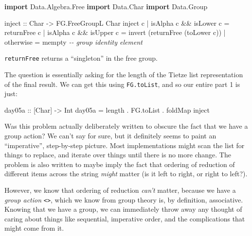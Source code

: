 \documentclass[]{article}
\newenvironment{Shaded}{}{}
\newcommand{\CommentTok}[1]{\textcolor[rgb]{0.38,0.63,0.69}{\textit{#1}}}
\newcommand{\DataTypeTok}[1]{\textcolor[rgb]{0.56,0.13,0.00}{#1}}
\newcommand{\FunctionTok}[1]{\textcolor[rgb]{0.02,0.16,0.49}{#1}}
\newcommand{\KeywordTok}[1]{\textcolor[rgb]{0.00,0.44,0.13}{\textbf{#1}}}
\newcommand{\NormalTok}[1]{#1}
\newcommand{\OperatorTok}[1]{\textcolor[rgb]{0.40,0.40,0.40}{#1}}
\newcommand{\OtherTok}[1]{\textcolor[rgb]{0.00,0.44,0.13}{#1}}
\begin{document}
\begin{Shaded}
\begin{Highlighting}[]
\KeywordTok{import}           \DataTypeTok{Data.Algebra.Free}
\KeywordTok{import}           \DataTypeTok{Data.Char}
\KeywordTok{import}           \DataTypeTok{Data.Group}

\OtherTok{inject ::} \DataTypeTok{Char} \OtherTok{{-}\textgreater{}} \DataTypeTok{FG.FreeGroupL} \DataTypeTok{Char}
\NormalTok{inject c}
    \OperatorTok{|} \FunctionTok{isAlpha}\NormalTok{ c }\OperatorTok{\&\&} \FunctionTok{isLower}\NormalTok{ c }\OtherTok{=}\NormalTok{ returnFree c}
    \OperatorTok{|} \FunctionTok{isAlpha}\NormalTok{ c }\OperatorTok{\&\&} \FunctionTok{isUpper}\NormalTok{ c }\OtherTok{=}\NormalTok{ invert (returnFree (}\FunctionTok{toLower}\NormalTok{ c))}
    \OperatorTok{|} \FunctionTok{otherwise}              \OtherTok{=} \FunctionTok{mempty}       \CommentTok{{-}{-} group identity element}
\end{Highlighting}
\end{Shaded}

\texttt{returnFree} returns a ``singleton'' in the free group.

The question is essentially asking for the length of the Tietze list
representation of the final result. We can get this using \texttt{FG.toList},
and so our entire part 1 is just:

\begin{Shaded}
\begin{Highlighting}[]
\OtherTok{day05a ::}\NormalTok{ [}\DataTypeTok{Char}\NormalTok{] }\OtherTok{{-}\textgreater{}} \DataTypeTok{Int}
\NormalTok{day05a }\OtherTok{=} \FunctionTok{length} \OperatorTok{.}\NormalTok{ FG.toList }\OperatorTok{.} \FunctionTok{foldMap}\NormalTok{ inject}
\end{Highlighting}
\end{Shaded}

Was this problem actually deliberately written to obscure the fact that we have
a group action? We can't say for sure, but it definitely seems to paint an
``imperative'', step-by-step picture. Most implementations might scan the list
for things to replace, and iterate over things until there is no more change.
The problem is also written to maybe imply the fact that ordering of reduction
of different items across the string \emph{might} matter (is it left to right,
or right to left?).

However, we know that ordering of reduction \emph{can't} matter, because we have
a \emph{group action} \texttt{\textless{}\textgreater{}}, which we know from
group theory is, by definition, associative. Knowing that we have a group, we
can immediately throw away any thought of caring about things like sequential,
imperative order, and the complications that might come from it.
\end{document}
